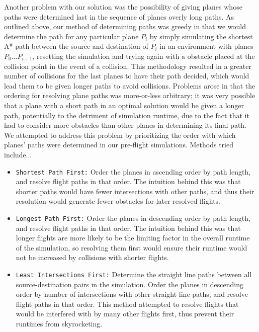 \documentclass[10pt]{article}
\newcommand{\ms}[1] {
  \texttt{#1}
}
\begin{document}
Another problem with our solution was the possibility of giving planes whose paths were 
determined last in the sequence of planes overly long paths. As outlined above, our
method of determining paths was greedy in that we would determine the path for any 
particular plane $P_i$ by simply simulating the shortest A* path between the source
and destination of $P_i$ in an environment with planes $P_0$...$P_{i-1}$, resetting
the simulation and trying again with a obstacle placed at the collision point in the
event of a collision. This methodology resulted in a greater number of collisions for the
last planes to have their path decided, which would lead them to be given longer paths to
avoid collisions. Problems arose in that the ordering for resolving plane paths was more-or-less
arbitrary; it was very possible that a plane with a short path in an optimal solution would be
given a longer path, potentially to the detriment of simulation runtime, due to the fact
that it had to consider more obstacles than other planes in determining its final path.\\

We attempted to address this problem by prioritizing the order with which planes' paths 
were determined in our pre-flight simulations. Methods tried include...\\

\begin{itemize}
  \item \ms{Shortest Path First:} Order the planes in ascending order by path length, and 
    resolve flight paths in that order. The intuition behind this was that shorter paths
    would have fewer intersections with other paths, and thus their resolution would generate
    fewer obstacles for later-resolved flights.
  \item \ms{Longest Path First:} Order the planes in descending order by path length, and
    resolve flight paths in that order. The intuition behind this was that longer flights
    are more likely to be the limiting factor in the overall runtime of the simulation, 
    so resolving them first would ensure their runtime would not be increased by collisions
    with shorter flights.
  \item \ms{Least Intersections First:} Determine the straight line paths between all
    source-destination pairs in the simulation. Order the planes in descending order by
    number of intersections with other straight line paths, and resolve flight paths in 
    that order. This method attempted to resolve flights that would be interfered with 
    by many other flights first, thus prevent their runtimes from skyrocketing.
\end{itemize}
\end{document}

